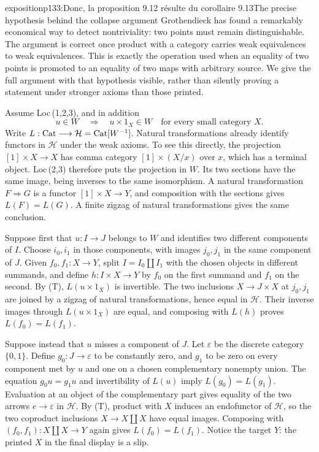 \begin{dcomment}{exposition}{p133:Donc, la proposition 9.12 résulte du corollaire 9.13}{The precise hypothesis behind the collapse argument}
Grothendieck has found a remarkably economical way to detect nontriviality: two points must remain distinguishable. The argument is correct once product with a category carries weak equivalences to weak equivalences. This is exactly the operation used when an equality of two points is promoted to an equality of two maps with arbitrary source. We give the full argument with that hypothesis visible, rather than silently proving a statement under stronger axioms than those printed.

Assume Loc\,(1,2,3), and in addition
\[
 u\in W\quad\Longrightarrow\quad u\times1_X\in W
 \quad\text{for every small category }X.\tag{T}
\]
Write $L:\mathrm{Cat}\longrightarrow\mathcal H=\mathrm{Cat}[W^{-1}]$. Natural transformations already identify functors in $\mathcal H$ under the weak axioms. To see this directly, the projection $[1]\times X\longrightarrow X$ has comma category $[1]\times(X/x)$ over $x$, which has a terminal object. Loc\,(2,3) therefore puts the projection in $W$. Its two sections have the same image, being inverses to the same isomorphism. A natural transformation $F\Rightarrow G$ is a functor $[1]\times X\longrightarrow Y$, and composition with the sections gives $L(F)=L(G)$. A finite zigzag of natural transformations gives the same conclusion.

Suppose first that $u:I\longrightarrow J$ belongs to $W$ and identifies two different components of $I$. Choose $i_0,i_1$ in those components, with images $j_0,j_1$ in the same component of $J$. Given $f_0,f_1:X\longrightarrow Y$, split $I=I_0\amalg I_1$ with the chosen objects in different summands, and define $h:I\times X\longrightarrow Y$ by $f_0$ on the first summand and $f_1$ on the second. By (T), $L(u\times1_X)$ is invertible. The two inclusions $X\longrightarrow J\times X$ at $j_0,j_1$ are joined by a zigzag of natural transformations, hence equal in $\mathcal H$. Their inverse images through $L(u\times1_X)$ are equal, and composing with $L(h)$ proves $L(f_0)=L(f_1)$.

Suppose instead that $u$ misses a component of $J$. Let $\varepsilon$ be the discrete category $\{0,1\}$. Define $g_0:J\longrightarrow\varepsilon$ to be constantly zero, and $g_1$ to be zero on every component met by $u$ and one on a chosen complementary nonempty union. The equation $g_0u=g_1u$ and invertibility of $L(u)$ imply $L(g_0)=L(g_1)$. Evaluation at an object of the complementary part gives equality of the two arrows $e\longrightarrow\varepsilon$ in $\mathcal H$. By (T), product with $X$ induces an endofunctor of $\mathcal H$, so the two coproduct inclusions $X\longrightarrow X\amalg X$ have equal images. Composing with $(f_0,f_1):X\amalg X\longrightarrow Y$ again gives $L(f_0)=L(f_1)$. Notice the target $Y$: the printed $X$ in the final display is a slip.


\end{dcomment}
